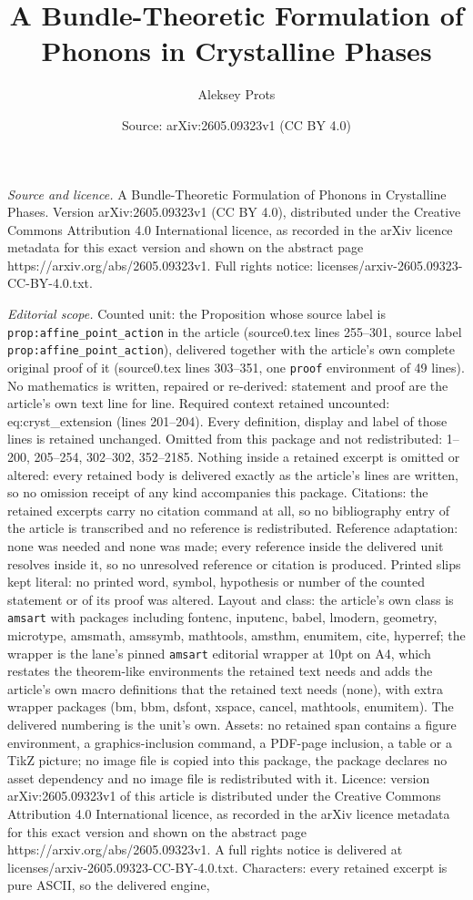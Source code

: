 \documentclass[10pt,a4paper]{amsart}
\title[A Bundle-Theoretic Formulation of Phonons in Crystalline Pha]{A Bundle-Theoretic Formulation of Phonons in Crystalline Phases}
\author{Aleksey Prots}
\date{Source: arXiv:2605.09323v1 (CC BY 4.0)}
\begin{document}
\maketitle

\noindent\emph{Source and licence.} A Bundle-Theoretic Formulation of Phonons in Crystalline Phases. Version arXiv:2605.09323v1 (CC BY 4.0), distributed under the Creative Commons Attribution 4.0 International licence, as recorded in the arXiv licence metadata for this exact version and shown on the abstract page https://arxiv.org/abs/2605.09323v1. Full rights notice: licenses/arxiv-2605.09323-CC-BY-4.0.txt.\par\smallskip

\noindent\textit{Editorial scope.} Counted unit: the Proposition whose source label is \texttt{prop:affine\_point\_action} in the article (source0.tex lines 255--301, source label \texttt{prop:affine\_point\_action}), delivered together with the article's own complete original proof of it (source0.tex lines 303--351, one \texttt{proof} environment of 49 lines). No mathematics is written, repaired or re-derived: statement and proof are the article's own text line for line. Required context retained uncounted: eq:cryst\_extension (lines 201--204). Every definition, display and label of those lines is retained unchanged. Omitted from this package and not redistributed: 1--200, 205--254, 302--302, 352--2185. Nothing inside a retained excerpt is omitted or altered: every retained body is delivered exactly as the article's lines are written, so no omission receipt of any kind accompanies this package. Citations: the retained excerpts carry no citation command at all, so no bibliography entry of the article is transcribed and no reference is redistributed. Reference adaptation: none was needed and none was made; every reference inside the delivered unit resolves inside it, so no unresolved reference or citation is produced. Printed slips kept literal: no printed word, symbol, hypothesis or number of the counted statement or of its proof was altered. Layout and class: the article's own class is \texttt{amsart} with packages including fontenc, inputenc, babel, lmodern, geometry, microtype, amsmath, amssymb, mathtools, amsthm, enumitem, cite, hyperref; the wrapper is the lane's pinned \texttt{amsart} editorial wrapper at 10pt on A4, which restates the theorem-like environments the retained text needs and adds the article's own macro definitions that the retained text needs (none), with extra wrapper packages (bm, bbm, dsfont, xspace, cancel, mathtools, enumitem). The delivered numbering is the unit's own. Assets: no retained span contains a figure environment, a graphics-inclusion command, a PDF-page inclusion, a table or a TikZ picture; no image file is copied into this package, the package declares no asset dependency and no image file is redistributed with it. Licence: version arXiv:2605.09323v1 of this article is distributed under the Creative Commons Attribution 4.0 International licence, as recorded in the arXiv licence metadata for this exact version and shown on the abstract page https://arxiv.org/abs/2605.09323v1. A full rights notice is delivered at licenses/arxiv-2605.09323-CC-BY-4.0.txt. Characters: every retained excerpt is pure ASCII, so the delivered engine, 
\end{document}

